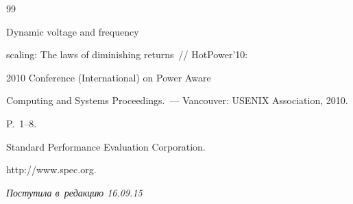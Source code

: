 {{\begin{thebibliography}{99}

 Dynamic voltage and frequency

scaling: The laws of diminishing returns~/\!\!/ HotPower'10:

2010  Conference (International) on Power Aware

Computing and Systems Proceedings.~--- Vancouver: USENIX Association, 2010.

P.~1--8.




Standard Performance Evaluation Corporation.

{\sf http://www.spec.org}.

   \end{thebibliography}

} }








\hfill{\small\textit{Поступила в~редакцию 16.09.15}}





















\pagebreak



\vspace*{-24pt}







\def\tit{ENERGY EFFICIENCY ESTIMATION OF~THE~COMPUTATIONAL

CLUSTER USING A~QUEUEING SYSTEM WITH~THRESHOLD CONTROL

AND~TIME-DEPENDENT SERVICE AND~ARRIVAL RATES}



\def\titkol{Energy efficiency estimation of the computational

cluster using a~queueing system} %





